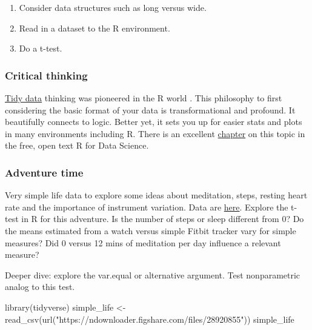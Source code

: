 \documentclass[
]{book}
\newenvironment{Shaded}{\begin{snugshade}}{\end{snugshade}}
\newcommand{\FunctionTok}[1]{\textcolor[rgb]{0.00,0.00,0.00}{#1}}
\newcommand{\NormalTok}[1]{#1}
\newcommand{\OtherTok}[1]{\textcolor[rgb]{0.56,0.35,0.01}{#1}}
\newcommand{\StringTok}[1]{\textcolor[rgb]{0.31,0.60,0.02}{#1}}
\providecommand{\tightlist}{%
  \setlength{\itemsep}{0pt}\setlength{\parskip}{0pt}}
\begin{document}
\begin{enumerate}
\def\labelenumi{\arabic{enumi}.}
\tightlist
\item
  Consider data structures such as long versus wide.\\
\item
  Read in a dataset to the R environment.\\
\item
  Do a t-test.
\end{enumerate}

\hypertarget{critical-thinking}{%
\subsubsection*{Critical thinking}\label{critical-thinking}}

\href{https://www.jstatsoft.org/article/view/v059i10}{Tidy data} thinking was pioneered in the R world \citep{RN4416}. This philosophy to first considering the basic format of your data is transformational and profound. It beautifully connects to logic. Better yet, it sets you up for easier stats and plots in many environments including R. There is an excellent \href{https://r4ds.had.co.nz/tidy-data.html}{chapter} on this topic in the free, open text R for Data Science.

\hypertarget{adventure-time}{%
\subsubsection*{Adventure time}\label{adventure-time}}

Very simple life data to explore some ideas about meditation, steps, resting heart rate and the importance of instrument variation. Data are \href{https://figshare.com/articles/dataset/Simple_health_data/15040515}{here}. Explore the t-test in R for this adventure. Is the number of steps or sleep different from 0? Do the means estimated from a watch versus simple Fitbit tracker vary for simple measures? Did 0 versus 12 mins of meditation per day influence a relevant measure?

Deeper dive: explore the var.equal or alternative argument. Test nonparametric analog to this test.

\begin{Shaded}
\begin{Highlighting}[]
\FunctionTok{library}\NormalTok{(tidyverse)}
\NormalTok{simple\_life }\OtherTok{\textless{}{-}} \FunctionTok{read\_csv}\NormalTok{(}\FunctionTok{url}\NormalTok{(}\StringTok{"https://ndownloader.figshare.com/files/28920855"}\NormalTok{))}
\NormalTok{simple\_life}
\end{Highlighting}
\end{Shaded}
\end{document}
